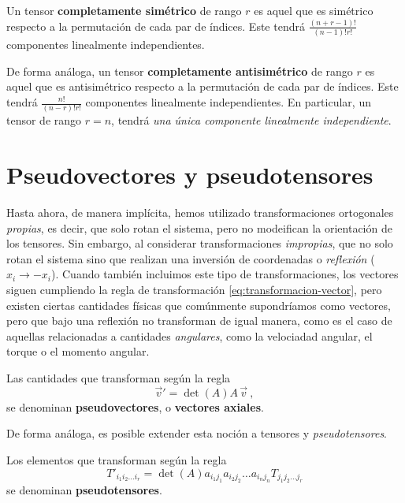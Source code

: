 \begin{itemize}
    Un tensor \textbf{completamente simétrico} de rango $r$ es aquel que es simétrico respecto a la permutación de cada par de índices. Este tendrá $\frac{(n+r-1)!}{(n-1)! r!}$ componentes linealmente independientes.

    De forma análoga, un tensor \textbf{completamente antisimétrico} de rango $r$ es aquel que es antisimétrico respecto a la permutación de cada par de índices. Este tendrá $\frac{n!}{(n-r)! r!}$ componentes linealmente independientes. En particular, un tensor de rango $r=n$, tendrá \emph{una única componente linealmente independiente}.
\end{itemize}

\section{Pseudovectores y pseudotensores}

Hasta ahora, de manera implícita, hemos utilizado transformaciones ortogonales \emph{propias}, es decir, que solo rotan el sistema, pero no modeifican la orientación de los tensores. Sin embargo, al considerar transformaciones \emph{impropias}, que no solo rotan el sistema sino que realizan una inversión de coordenadas o \emph{reflexión} ($x_i \to -x_i$). Cuando también incluimos este tipo de transformaciones, los vectores siguen cumpliendo la regla de transformación \eqref{eq:transformacion-vector}, pero existen ciertas cantidades físicas que comúnmente supondríamos como vectores, pero que bajo una reflexión no transforman de igual manera, como es el caso de aquellas relacionadas a cantidades \emph{angulares}, como la velociadad angular, el torque o el momento angular.

\begin{defi} 
    Las cantidades que transforman según la regla
    \begin{equation} \label{eq:pseudovector}
        \vec{v}' = \det(A) A \, \vec{v} \ ,
    \end{equation}
    se denominan \textbf{pseudovectores}, o \textbf{vectores axiales}.
\end{defi}

De forma análoga, es posible extender esta noción a tensores y \emph{pseudotensores}.

\begin{defi} 
    Los elementos que transforman según la regla
    \begin{equation}
        T'_{i_1 i_2 \dots i_r} = \det(A) a_{i_1 j_1} a_{i_2 j_2} \dots a_{i_n j_n} T_{j_1 j_2 \dots j_r} 
    \end{equation}
    se denominan \textbf{pseudotensores}.
\end{defi}

